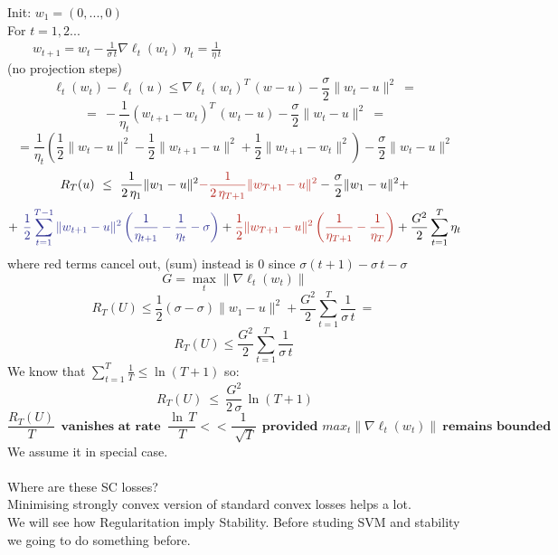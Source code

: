 \documentclass[../main.tex]{subfiles}
\begin{document}
Init: $w_1 =(0,...,0)$\\
For $t = 1,2...$\\
$\qquad w_{t+1} = w_t -\frac{1}{\sigma \, t} \nabla \ell_t(w_t)$ \qquad $\eta_t = \frac{1}{\eta \, t}$
\\
(no projection steps)\\
$$
\ell_t (w_t) - \ell_t(u) \leq \nabla \ell_t (w_t)^T \, (w-u) - \frac{\sigma}{2} \| w_t - u \|^2 \ = 
$$
$$
= \ - \frac{1}{\eta_t} (w_{t+1} - w_t)^T \, (w_t-u) - \frac{\sigma}{2} \| w_t -u \|^2 \ =
$$
$$
= \frac{1}{\eta_t} \left( \frac{1}{2} \| w_t - u\|^2 - \frac{1}{2} \| w_{t+1} - u \|^2 + \frac{1}{2}  \| w_{t+1} - w_t \|^2 \right) - \frac{\sigma}{2} \| w_t -u \|^2
$$
$$
R_T(u) \ \leq \ \frac{1}{2 \, \eta_1} \|w_1 -u \|^2 
\red{- \frac{1}{2 \, \eta_{T+1} } \| w_{T+1} - u \|^2}
 - \frac{\sigma
}{2} \| w_1 -u \|^2  +
$$
$$
+ \blue{ $\frac{1}{2} \sum_{t=1}^{T-1} \| w_{t+1} - u \|^2 \left( \frac{1}{\eta_{t+1}} - \frac{1}{\eta_t} - \sigma \right) $} + 
\red{\frac{1}{2} \| w_{T+1} - u \|^2 \left( \frac{1}{\eta_{T+1}} 
- \frac{1}{\eta_T} \right) }
+ \frac{G^2}{2} \sum_{t=1}^T \eta_t
$$
where red terms cancel out,  (sum) instead is $0$ since $ \sigma(t+1) - \sigma \, t - \sigma$
$$
G = \max_t \| \nabla \ell_t(w_t) \|
$$
$$
R_T(U) \leq \frac{1}{2} \left( \sigma - \sigma \right) \| w_1 -u \|^2 + \frac{G^2}{2} \sum_{t=1}^T \frac{1}{\sigma \, t} \ = \
$$
$$
R_T(U) \leq  \frac{G^2}{2} \sum_{t=1}^T \frac{1}{\sigma \, t} \
$$
We know that $\sum_{t=1}^T \frac{1}{T} \leq \ln \left( T+1  \right)$
so:
$$
R_T(U) \ \leq \ \frac{G^2}{2 \, \sigma} \, \ln \left( T+1 \right) 
$$
$$
\frac{R_T(U)}{T} \ \ \textbf{vanishes at rate } \ \frac{\ln \, T}{T} < < \frac{1}{\sqrt[]{T}} \ \ \textbf{provided } max_t \| \nabla \ell_t (w_t) \| \ \textbf{remains bounded}
$$
We assume it in special case.
\\\\
Where are these SC losses?
\\
Minimising strongly convex version of standard convex losses helps a lot. 
\\
We will see how Regularitation imply Stability. Before studing SVM and stability we going to do something before.
\\
\end{document}
